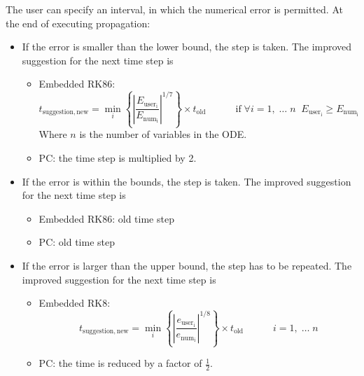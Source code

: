         The user can specify an interval, in which the numerical error is permitted. At the end of executing propagation:
        \begin{itemize}
            \item If the error is smaller than the lower bound, the step is taken. The improved suggestion for the next time step is
            \begin{itemize}
                \item Embedded RK86: 
                \begin{equation}
                    t_{\mathrm{suggestion, new}} =  \min \limits_{i} \left \{ \left|  \frac{ E_{\mathrm{user_i}} }{ E_{\mathrm{num_i}} } \right |^{1/7 } \right \} \times t_{\mathrm{old}}
                    \quad \quad \quad \mathrm{if} \; \forall i = {1,\; \ldots \; n} \; \;  E_{\mathrm{user_i}} \geqslant E_{\mathrm{num_i}}
                \end{equation}
                Where $n$ is the number of variables in the ODE.
                \item PC: the time step is multiplied by 2.
            \end{itemize}
            \item If the error is within the bounds, the step is taken. The improved suggestion for the next time step is
            \begin{itemize}
                \item Embedded RK86: old time step
                \item PC: old time step
            \end{itemize}
            \item If the error is larger than the upper bound, the step has to be repeated. The improved suggestion for the next time step is            
            \begin{itemize}
                \item Embedded RK8:
                \begin{equation}
                    t_{\mathrm{suggestion, new}} =  \min \limits_{i} \left \{ \left|  \frac{ e_{\mathrm{user_i}} }{ e_{\mathrm{num_i}} } \right |^{1/8 } \right \} \times t_{\mathrm{old}}
                \quad \quad \quad i = {1,\; \ldots \; n}
                \end{equation}
                \item PC: the time is reduced by a factor of $\frac{1}{2}$.
            \end{itemize}
        \end{itemize}
